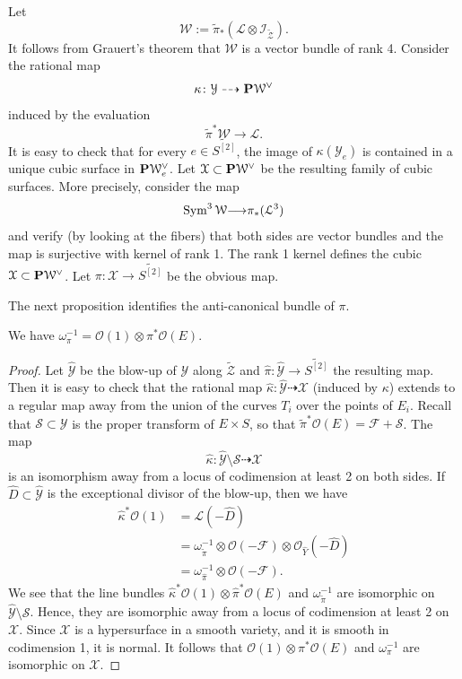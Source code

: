 \documentclass[11pt,reqno, letterpaper]{amsart}
\renewcommand{\to}{{\longrightarrow}}
\numberwithin{equation}{section}
\renewcommand{\O}{\mathcal O}
\begin{document}
Let
\[
\mathcal W := \widetilde \pi_* \left( \mathcal L \otimes \mathcal I_{\widetilde{\mathcal Z}} \right).
\]
It follows from Grauert's theorem that $\mathcal W$ is a vector bundle of rank 4.
Consider the rational map
\[ \kappa \colon \mathcal Y \dashrightarrow \P \mathcal W^\vee\]
induced by the evaluation
\[ \widetilde \pi^* \mathcal W \to \mathcal L.\]
It is easy to check that for every $e \in \widetilde{S^{[2]}}$, the image of $\kappa(\mathcal Y_e)$ is contained in a unique cubic surface in $\P \mathcal W^\vee_e$.
Let $\mathcal X \subset \P \mathcal W^\vee$ be the resulting family of cubic surfaces.
More precisely, consider the map
\[ \Sym^3 \mathcal W \to \pi_*(\mathcal L^3)\]
and verify (by looking at the fibers) that both sides are vector bundles and the map is surjective with kernel of rank 1.
The rank 1 kernel defines the cubic $\mathcal X \subset \P \mathcal W^\vee$.
Let $\pi \colon \mathcal X \to \widetilde{S^{[2]}}$ be the obvious map.

The next proposition identifies the anti-canonical bundle of $\pi$.
\begin{proposition}
  We have $\omega_\pi^{-1} = \O(1) \otimes \pi^*\O(E)$.
\end{proposition}
\begin{proof}
  Let $\widehat {\mathcal Y}$ be the blow-up of $\mathcal Y$ along $\widetilde{\mathcal Z}$ and $\widehat \pi \colon \widehat{\mathcal Y} \to \widetilde{S^{[2]}}$ the resulting map.
  Then it is easy to check that the rational map $\widehat\kappa \colon \widehat {\mathcal Y} \dashrightarrow \mathcal X$ (induced by $\kappa$) extends to a regular map away from the union of the curves $T_i$ over the points of $E_i$.
  Recall that $\mathcal S \subset \mathcal Y$ is the proper transform of $E \times S$, so that $\widetilde \pi^* \O(E) = \mathcal F + \mathcal S$.
  The map
  \[
    \widehat \kappa \colon \widehat {\mathcal Y} \setminus \mathcal S \dashrightarrow \mathcal X
  \]
  is an isomorphism away from a locus of codimension at least 2 on both sides.
  If $\widehat D \subset \widehat {\mathcal Y}$ is the exceptional divisor of the blow-up, then we have
  \begin{align*}
    \widehat \kappa ^* \O(1) &= \mathcal L(-\widehat D) \\
                             &= \omega^{-1}_{\widetilde \pi} \otimes \O(-\mathcal F) \otimes \O_{\widehat Y}(-\widehat D) \\
                             &= \omega_{\widehat \pi}^{-1} \otimes \O(-\mathcal F).
  \end{align*}
  We see that the line bundles $\widehat \kappa^* \O(1) \otimes \widehat \pi^* \O(E)$ and $\omega_{\widetilde \pi}^{-1}$ are isomorphic on $\widehat {\mathcal Y} \setminus \mathcal S$.
  Hence, they are isomorphic away from a locus of codimension at least 2 on $\mathcal X$.
  Since $\mathcal X$ is a hypersurface in a smooth variety, and it is smooth in codimension 1, it is normal.
  It follows that $\O(1) \otimes \pi^* \O(E)$ and $\omega_\pi^{-1}$ are isomorphic on $\mathcal X$.
\end{proof}
\end{document}
